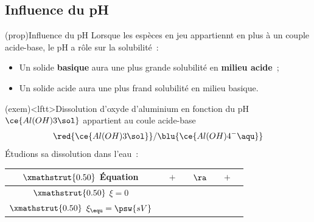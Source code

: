 \documentclass[../../main/main.tex]{subfiles}
\begin{document}
\subsection{Influence du pH}
\begin{tcb*}(prop){Influence du pH}
  Lorsque les espèces en jeu appartiennt en plus à un couple acide-base, le pH a
  rôle sur la solubilité~:
  \begin{itemize}
    \item Un solide \textbf{basique} aura une plus grande solubilité en
      \textbf{milieu acide}~;
    \item Un solide acide aura une plus frand solubilité en milieu basique.
  \end{itemize}
\end{tcb*}
\begin{tcb*}(exem)<lftt>{Dissolution d'oxyde d'aluminium en fonction du pH}
  $\ce{Al(OH)3\sol}$ appartient au coule acide-base
  \[
    \red{\ce{Al(OH)3\sol}}/\blu{\ce{Al(OH)4^-\aqu}}
  \]
  Étudions sa dissolution dans l'eau~:
  \smallbreak
  \noindent
  \begin{minipage}[c]{.69\linewidth}
    \begin{center}
       \def\rhgt{0.50}
        \centering
       \begin{tabularx}{\linewidth}{|c||YdYdYdY|}
        \hline
          $\xmathstrut{\rhgt}$ \textbf{Équation} &
                & $+$                 &
                & $\ra$               &
                & $+$                 &
                                      \\
        \hline
        $\xmathstrut{\rhgt}$
         $\xi = 0$           &
                       & \vline              &
                       & \vline              &
                       & \vline              &
                                             \\
        \hline
        $\xmathstrut{\rhgt}$
         $\xi_{\equ} = \psw{sV}$         &
             & \vline              &
             & \vline              &
             & \vline              &
                                   \\
        \hline
       \end{tabularx}
    \end{center}
    \vspace{-15pt}
    \psw{
}
\end{minipage}
\end{tcb*}
\end{document}
